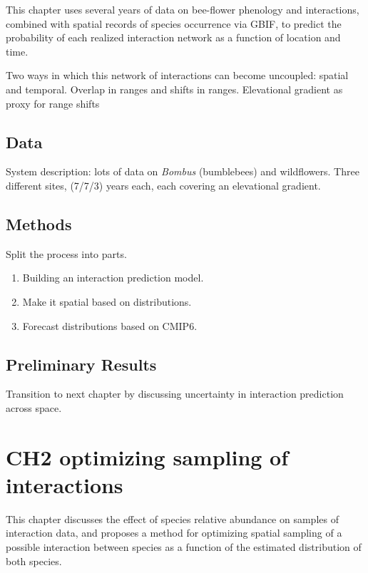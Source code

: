 \documentclass[10pt,oneside]{article}
\begin{document}
This chapter uses several years of data on bee-flower phenology and
interactions, combined with spatial records of species occurrence via
GBIF, to predict the probability of each realized interaction network as
a function of location and time.

Two ways in which this network of interactions can become uncoupled:
spatial and temporal. Overlap in ranges and shifts in ranges.
Elevational gradient as proxy for range shifts

\hypertarget{data}{%
\subsection{Data}\label{data}}

System description: lots of data on \emph{Bombus} (bumblebees) and
wildflowers. Three different sites, (7/7/3) years each, each covering an
elevational gradient.

\hypertarget{methods}{%
\subsection{Methods}\label{methods}}

Split the process into parts.

\begin{enumerate}
\def\labelenumi{\arabic{enumi})}
\tightlist
\item
  Building an interaction prediction model.
\item
  Make it spatial based on distributions.
\item
  Forecast distributions based on CMIP6.
\end{enumerate}

\hypertarget{preliminary-results}{%
\subsection{Preliminary Results}\label{preliminary-results}}

Transition to next chapter by discussing uncertainty in interaction
prediction across space.

\hypertarget{ch2-optimizing-sampling-of-interactions}{%
\section{CH2 optimizing sampling of
interactions}\label{ch2-optimizing-sampling-of-interactions}}

This chapter discusses the effect of species relative abundance on
samples of interaction data, and proposes a method for optimizing
spatial sampling of a possible interaction between species as a function
of the estimated distribution of both species.
\end{document}
